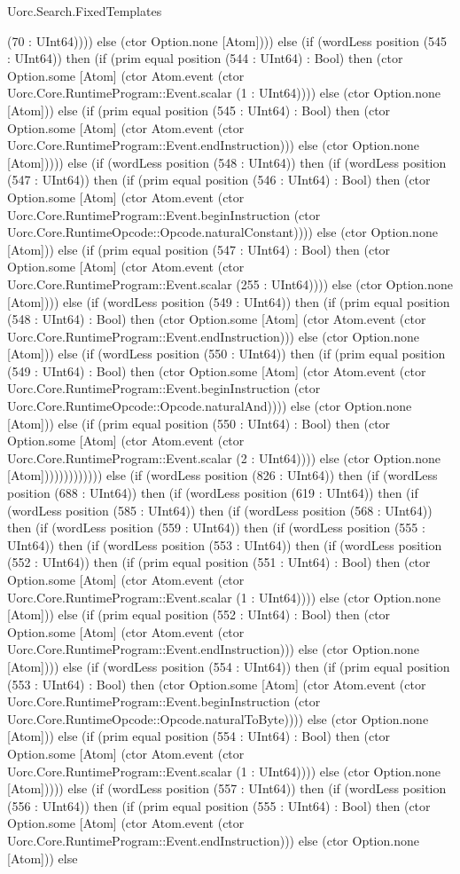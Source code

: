 \begin{lexlean}{Uorc.Search.FixedTemplates}
\begin{semanticmodule}
{(70 : UInt64)))) else (ctor Option.none [Atom]))) else (if (wordLess position (545 : UInt64)) then (if (prim equal position (544 : UInt64) : Bool) then (ctor Option.some [Atom] (ctor Atom.event (ctor Uorc.Core.RuntimeProgram::Event.scalar (1 : UInt64)))) else (ctor Option.none [Atom])) else (if (prim equal position (545 : UInt64) : Bool) then (ctor Option.some [Atom] (ctor Atom.event (ctor Uorc.Core.RuntimeProgram::Event.endInstruction))) else (ctor Option.none [Atom])))) else (if (wordLess position (548 : UInt64)) then (if (wordLess position (547 : UInt64)) then (if (prim equal position (546 : UInt64) : Bool) then (ctor Option.some [Atom] (ctor Atom.event (ctor Uorc.Core.RuntimeProgram::Event.beginInstruction (ctor Uorc.Core.RuntimeOpcode::Opcode.naturalConstant)))) else (ctor Option.none [Atom])) else (if (prim equal position (547 : UInt64) : Bool) then (ctor Option.some [Atom] (ctor Atom.event (ctor Uorc.Core.RuntimeProgram::Event.scalar (255 : UInt64)))) else (ctor Option.none [Atom]))) else (if (wordLess position (549 : UInt64)) then (if (prim equal position (548 : UInt64) : Bool) then (ctor Option.some [Atom] (ctor Atom.event (ctor Uorc.Core.RuntimeProgram::Event.endInstruction))) else (ctor Option.none [Atom])) else (if (wordLess position (550 : UInt64)) then (if (prim equal position (549 : UInt64) : Bool) then (ctor Option.some [Atom] (ctor Atom.event (ctor Uorc.Core.RuntimeProgram::Event.beginInstruction (ctor Uorc.Core.RuntimeOpcode::Opcode.naturalAnd)))) else (ctor Option.none [Atom])) else (if (prim equal position (550 : UInt64) : Bool) then (ctor Option.some [Atom] (ctor Atom.event (ctor Uorc.Core.RuntimeProgram::Event.scalar (2 : UInt64)))) else (ctor Option.none [Atom])))))))))))) else (if (wordLess position (826 : UInt64)) then (if (wordLess position (688 : UInt64)) then (if (wordLess position (619 : UInt64)) then (if (wordLess position (585 : UInt64)) then (if (wordLess position (568 : UInt64)) then (if (wordLess position (559 : UInt64)) then (if (wordLess position (555 : UInt64)) then (if (wordLess position (553 : UInt64)) then (if (wordLess position (552 : UInt64)) then (if (prim equal position (551 : UInt64) : Bool) then (ctor Option.some [Atom] (ctor Atom.event (ctor Uorc.Core.RuntimeProgram::Event.scalar (1 : UInt64)))) else (ctor Option.none [Atom])) else (if (prim equal position (552 : UInt64) : Bool) then (ctor Option.some [Atom] (ctor Atom.event (ctor Uorc.Core.RuntimeProgram::Event.endInstruction))) else (ctor Option.none [Atom]))) else (if (wordLess position (554 : UInt64)) then (if (prim equal position (553 : UInt64) : Bool) then (ctor Option.some [Atom] (ctor Atom.event (ctor Uorc.Core.RuntimeProgram::Event.beginInstruction (ctor Uorc.Core.RuntimeOpcode::Opcode.naturalToByte)))) else (ctor Option.none [Atom])) else (if (prim equal position (554 : UInt64) : Bool) then (ctor Option.some [Atom] (ctor Atom.event (ctor Uorc.Core.RuntimeProgram::Event.scalar (1 : UInt64)))) else (ctor Option.none [Atom])))) else (if (wordLess position (557 : UInt64)) then (if (wordLess position (556 : UInt64)) then (if (prim equal position (555 : UInt64) : Bool) then (ctor Option.some [Atom] (ctor Atom.event (ctor Uorc.Core.RuntimeProgram::Event.endInstruction))) else (ctor Option.none [Atom])) else }
\end{semanticmodule}
\end{lexlean}
